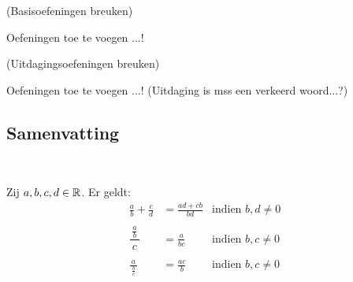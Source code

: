 \documentclass[numbers]{ximera}
\begin{document}
\begin{exercise} (Basisoefeningen breuken)\ 
	
    Oefeningen toe te voegen ...!
\end{exercise}

\begin{exercise} (Uitdagingsoefeningen breuken)\ 
	
	Oefeningen toe te voegen ...! (Uitdaging is mss een verkeerd woord...?)
\end{exercise}


\subsection{Samenvatting}

\begin{proposition}\label{breukensamenvatting} \ 
	
	Zij $a,b,c,d\in \mathbb{R}$. Er geldt:
	\begin{align*}
		\frac{a}{b}+\frac{c}{d}& =\frac{ad+cb}{bd} & \text{indien } b,d \neq 0 \\ \\
		\dfrac{\frac{a}{b}}{\ c\ }&=\frac{a}{bc}  & \text{indien }b,c \neq 0 \\ \\
		\frac{a}{\ \frac{b}{c}\ }&=\frac{ac}{b}  & \text{indien } b,c \neq 0 \\ \\
	\end{align*}
\end{proposition}
\end{document}
